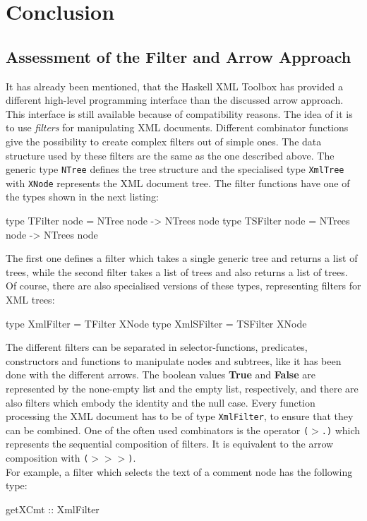 \documentclass[11pt,a4paper,headsepline, bibtotoc]{scrreprt}
\begin{document}
\chapter{Conclusion}\label{concl}
\section{Assessment of the Filter and Arrow Approach}
It has already been mentioned, that the Haskell XML Toolbox has provided a different high-level programming interface than the discussed arrow approach. This interface is still available because of compatibility reasons. The idea of it is to use \textit{filters} for manipulating XML documents. Different combinator functions give the possibility to create complex filters out of simple ones. The data structure used by these filters are the same as the one described above. The generic type \texttt{NTree} defines the tree structure and the specialised type \texttt{XmlTree} with \texttt{XNode} represents the XML document tree. The filter functions have one of the types shown in the next listing:
\begin{code}
type TFilter node = NTree node -> NTrees node
type TSFilter node = NTrees node -> NTrees node
\end{code}
The first one defines a filter which takes a single generic tree and returns a list of trees, while the second filter takes a list of trees and also returns a list of trees. Of course, there are also specialised versions of these types, representing filters for XML trees:
\begin{code}
type XmlFilter = TFilter XNode
type XmlSFilter = TSFilter XNode 
\end{code}
The different filters can be separated in selector-functions, predicates, constructors and functions to manipulate nodes and subtrees, like it has been done with the different arrows. The boolean values \textbf{True} and \textbf{False} are represented by the none-empty list and the empty list, respectively, and there are also filters which embody the identity and the null case. Every function processing the XML document has to be of type \texttt{XmlFilter}, to ensure that they can be combined. One of the often used combinators is the operator \texttt{($>$.)} which represents the sequential composition of filters. It is equivalent to the arrow composition with \texttt{($>$$>$$>$)}.\\
For example, a filter which selects the text of a comment node has the following type:
\begin{code}
getXCmt :: XmlFilter
\end{code}
\end{document}
